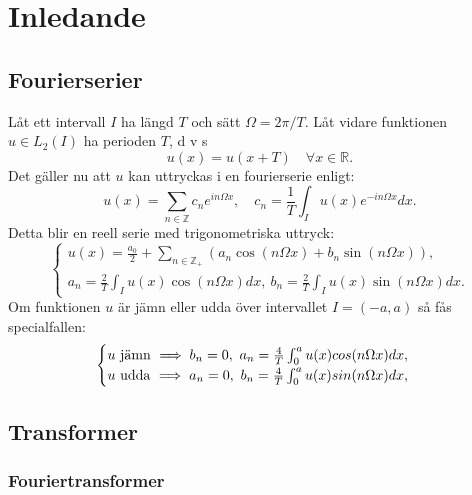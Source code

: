 \documentclass{article}
\begin{document}
\tableofcontents
\newpage

\section{Inledande}
\subsection{Fourierserier}
Låt ett intervall $I$ ha längd $T$ och sätt $\Omega=2\pi/T$. Låt vidare funktionen $u\in L_2(I)$ ha perioden $T$, d v s
\begin{equation}
    u(x)=u(x+T) \quad \forall x\in\mathbb{R}.
\end{equation}
Det gäller nu att $u$ kan uttryckas i en fourierserie enligt:
\begin{equation}\label{eq:ek2}
    u(x)=\sum_{n\in\mathbb{Z}}c_ne^{in\Omega x}, \quad c_n=\frac{1}{T}\int_Iu(x)e^{-in\Omega x}dx.
\end{equation}
Detta blir en reell serie med trigonometriska uttryck:
\begin{equation}
    \begin{cases}
       u(x)=\frac{a_0}{2}+\sum_{n\in\mathbb{Z}_+}(a_n\cos(n\Omega x)+b_n\sin(n\Omega x)),\\
       a_n=\frac{2}{T}\int_Iu(x)\cos(n\Omega x)dx, \ b_n=\frac{2}{T}\int_Iu(x)\sin(n\Omega x)dx.
    \end{cases}
\end{equation}
Om funktionen $u$ är jämn eller udda över intervallet $I=(-a,a)$ så fås specialfallen:
\begin{equation}
    \begin{cases}
        u \ $jämn$ \ \implies b_n=0, \ a_n=\frac{4}{T}\int_0^au(x)cos(n\Omega x)dx,\\
        u \ $udda$ \ \implies a_n=0, \ b_n=\frac{4}{T}\int_0^au(x)sin(n\Omega x)dx,
    \end{cases}
\end{equation}
\subsection{Transformer}
\subsubsection*{Fouriertransformer}
\end{document}
